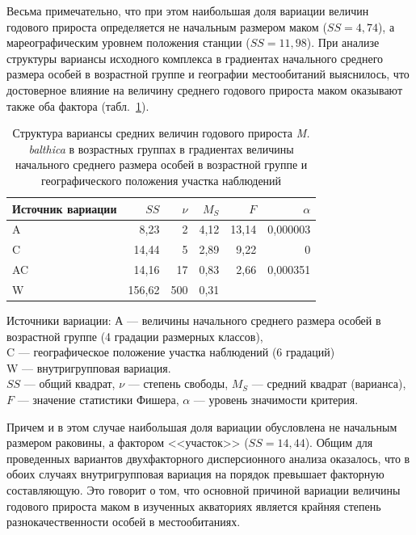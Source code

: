 Весьма примечательно, что при этом наибольшая доля вариации величин годового прироста определяется не начальным размером маком ($SS = 4,74$), а мареографическим уровнем положения станции ($SS = 11,98$).
При анализе структуры вариансы исходного комплекса в градиентах начального среднего размера особей в возрастной группе и географии местообитаний выяснилось, что достоверное влияние на величину среднего годового прироста маком оказывают также оба фактора (табл.~\ref{tab:prirost_ANOVA_geography}).
\begin{table}[p]
    \caption{Структура вариансы средних величин годового прироста {\it M. balthica} в возрастных группах в градиентах величины начального среднего размера особей в возрастной группе и географического положения участка наблюдений}
    \label{tab:prirost_ANOVA_geography}
    \begin{center}
    \begin{tabular}{|l|rrrrr|}
        \hline
    Источник вариации & $SS$   & $\nu$   & $M_S$   & $F$     & $\alpha$     \\ \hline
        A                 & 8,23   & 2   & 4,12 & 13,14 & 0,000003 \\
        C                 & 14,44  & 5   & 2,89 & 9,22  & 0        \\
        AC                & 14,16  & 17  & 0,83 & 2,66  & 0,000351 \\
        W                 & 156,62 & 500 & 0,31 &       &         \\ \hline
    \end{tabular}
\end{center}

    \footnotesize{Источники вариации: А --- величины начального среднего размера особей в возрастной группе (4 градации размерных классов),\\ 
        C --- географическое положение участка наблюдений (6 градаций)\\
    W --- внутригрупповая вариация.\\
    $SS$ --- общий квадрат, $\nu$ --- степень свободы, $M_S$ --- средний квадрат (варианса), $F$ --- значение статистики Фишера, $\alpha$ --- уровень значимости критерия.}
\end{table}
Причем и в этом случае наибольшая доля вариации обусловлена не начальным размером раковины, а фактором <<участок>> ($SS = 14,44$).
Общим для проведенных вариантов двухфакторного дисперсионного анализа оказалось, что в обоих случаях внутригрупповая вариация на порядок превышает факторную составляющую. 
Это говорит о том, что основной причиной вариации величины годового прироста маком в изученных акваториях является крайняя степень разнокачественности особей в местообитаниях. 
